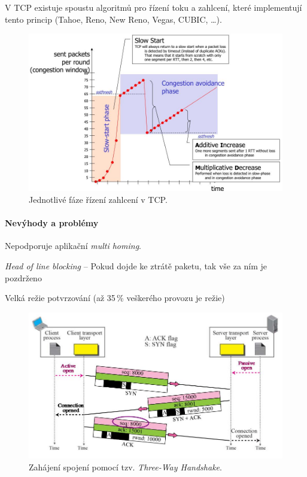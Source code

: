 \noindent V TCP existuje spoustu algoritmů pro řízení toku a zahlcení, které implementují tento princip (Tahoe, Reno, New Reno, Vegas, CUBIC, \dots).

\begin{figure}[H]
    \centering
    \includegraphics[width=1\linewidth]{ss_ca_ai_md.png}
    \caption{Jednotlivé fáze řízení zahlcení v TCP.}
\end{figure}

\paragraph*{Nevýhody a problémy} \begin{compactitem}
    \item Nepodporuje aplikační \textit{multi homing}.
    \item \textit{Head of line blocking} -- Pokud dojde ke ztrátě paketu, tak vše za ním je pozdrženo
    \item Velká režie potvrzování (až 35\,\% veškerého provozu je režie)
\end{compactitem}

\begin{figure}[H]
    \centering
    \includegraphics[width=1\linewidth]{tcp_zahajeni_spojeni.png}
    \caption{Zahájení spojení pomocí tzv. \textit{Three-Way Handshake}.}
\end{figure}

